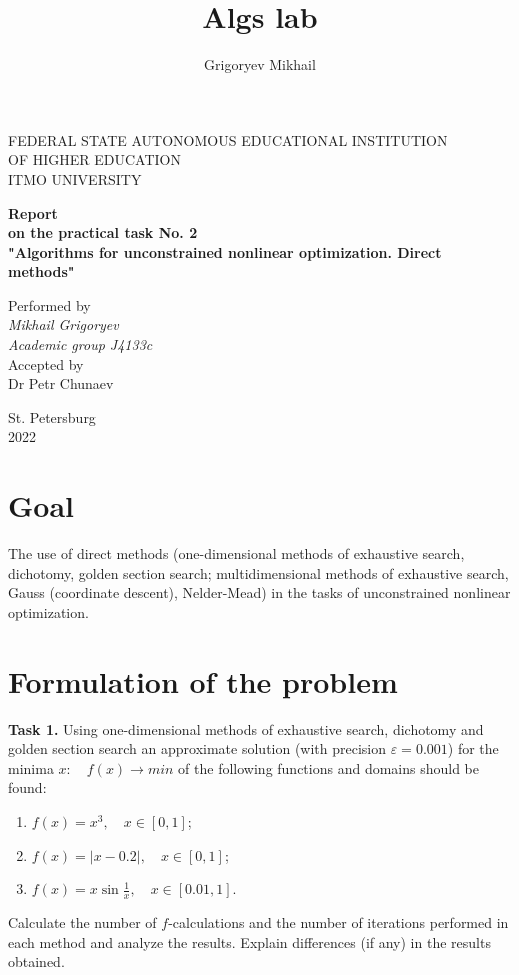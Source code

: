 \documentclass[12pt, a4paper]{article}
\author{Grigoryev Mikhail}
\title{Algs lab}
\begin{document}
\thispagestyle{empty}

\vspace{30mm}

\begin{center}
FEDERAL STATE AUTONOMOUS EDUCATIONAL INSTITUTION \\
OF HIGHER EDUCATION \\
ITMO UNIVERSITY

\vspace{40mm}

{\large \textbf{Report \\
on the practical task No. 2 \\
"Algorithms for unconstrained nonlinear optimization. Direct methods"}}
\end{center}

\vspace{15mm}

\begin{flushright}
{\large Performed by \\
\textit{Mikhail Grigoryev \\
Academic group J4133c \\}
Accepted by \\
Dr Petr Chunaev}
\end{flushright}

\vspace{100mm}

\begin{center}
St. Petersburg \\
2022
\end{center}

\newpage

\section*{Goal}

The use of direct methods (one-dimensional methods of exhaustive search, dichotomy, golden section search; multidimensional methods of exhaustive search, Gauss (coordinate descent), Nelder-Mead) in the tasks of unconstrained nonlinear optimization.

\section*{Formulation of the problem}

\textbf{Task 1.} Using one-dimensional methods of exhaustive search, dichotomy and golden section search an approximate solution (with precision $\varepsilon = 0.001$) for the minima $x: \quad f(x) \to min$ of the following functions and domains should be found:
\begin{enumerate}
	\item $f(x) = x^3, \quad x\in [0, 1]$;
	\item $f(x) = |x-0.2|, \quad x\in [0, 1]$;
	\item $f(x) = x\sin \frac{1}{x}, \quad x\in [0.01, 1]$.
\end{enumerate}
Calculate the number of $f$-calculations and the number of iterations performed in each method and analyze the results. Explain differences (if any) in the results obtained.
\end{document}
